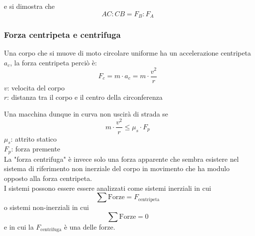e si dimostra che 
\begin{equation*}
  AC:CB=F_B:F_A
\end{equation*}

\subsubsection{Forza centripeta e centrifuga}
Una corpo che si muove di moto circolare uniforme ha un accelerazione centripeta $a_c$, la forza 
centripeta perciò è:   
\begin{equation*}
  F_c =m\cdot a_c= m\cdot\frac{v^{2}}{r}
\end{equation*}
$v$: velocita del corpo\\
$r$: distanza tra il corpo e il centro della circonferenza
\begin{center}	
\end{center}
Una macchina dunque in curva non uscirà di strada se 
\begin{equation*}
  m\cdot\frac{v^{2}}{r} \leq \mu_s\cdot F_p
\end{equation*}
$\mu_s$: attrito statico\\
$F_p$: forza premente\\ [\baselineskip]

La "forza centrifuga" è invece solo una forza apparente che sembra esistere nel sistema di 
riferimento non inerziale del corpo in movimento che ha modulo opposto alla forza centripeta.\\
I sistemi possono essere essere analizzati come sistemi inerziali in cui 
\begin{equation*}
  \sum \text{Forze}=F_{\text{centripeta}}
\end{equation*}
o sistemi non-inerziali in cui 
\begin{equation*}
\sum \text{Forze}=0
\end{equation*}
e in cui la $F_{\text{centrifuga}}$ è una delle forze.

